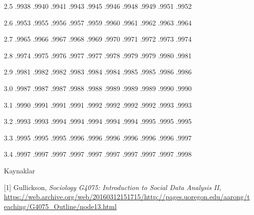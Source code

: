 \documentclass[12pt,fleqn]{article}\usepackage{../../common}
\begin{document}
2.5 .9938 .9940 .9941 .9943 .9945 .9946 .9948 .9949 .9951 .9952

2.6 .9953 .9955 .9956 .9957 .9959 .9960 .9961 .9962 .9963 .9964

2.7 .9965 .9966 .9967 .9968 .9969 .9970 .9971 .9972 .9973 .9974

2.8 .9974 .9975 .9976 .9977 .9977 .9978 .9979 .9979 .9980 .9981

2.9 .9981 .9982 .9982 .9983 .9984 .9984 .9985 .9985 .9986 .9986

3.0 .9987 .9987 .9987 .9988 .9988 .9989 .9989 .9989 .9990 .9990

3.1 .9990 .9991 .9991 .9991 .9992 .9992 .9992 .9992 .9993 .9993

3.2 .9993 .9993 .9994 .9994 .9994 .9994 .9994 .9995 .9995 .9995

3.3 .9995 .9995 .9995 .9996 .9996 .9996 .9996 .9996 .9996 .9997

3.4 .9997 .9997 .9997 .9997 .9997 .9997 .9997 .9997 .9997 .9998

Kaynaklar

[1] Gullickson, {\em Sociology G4075: Introduction to Social Data Analysis
  II}, \url{https://web.archive.org/web/20160312151715/http://pages.uoregon.edu/aarong/teaching/G4075_Outline/node13.html}
\end{document}
